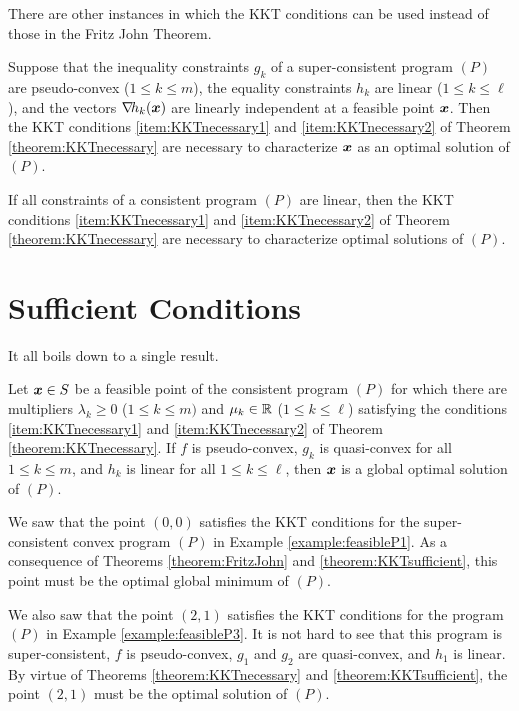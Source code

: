 \separator

There are other instances in which the KKT conditions can be used instead of those in the Fritz John Theorem.

\begin{theorem}\label{theorem:Slater}
Suppose that the inequality constraints $g_k$ of a super-consistent program $(P)$ are pseudo-convex ($1\leq k \leq m$), the equality constraints $h_k$ are linear ($1\leq k \leq \ell$), and the vectors $\mathop{\nabla\! {h_k}}(\boldsymbol{x})$ are linearly independent at a feasible point $\boldsymbol{x}$.  Then the KKT conditions \ref{item:KKTnecessary1} and \ref{item:KKTnecessary2} of Theorem \ref{theorem:KKTnecessary} are necessary to characterize $\boldsymbol{x}$ as an optimal solution of $(P)$.
\end{theorem}

\begin{theorem}\label{theorem:KKTAllLinear}
If all constraints of a consistent program $(P)$ are linear, then the KKT conditions \ref{item:KKTnecessary1} and \ref{item:KKTnecessary2} of Theorem \ref{theorem:KKTnecessary} are necessary to characterize optimal solutions of $(P)$.
\end{theorem}

\section{Sufficient Conditions}

It all boils down to a single result.

\begin{theorem}\label{theorem:KKTsufficient}
Let $\boldsymbol{x} \in S$ be a feasible point of the consistent program $(P)$ for which there are multipliers $\lambda_k \geq 0$ ($1\leq k \leq m)$ and $\mu_k \in \mathbb{R}$ ($1\leq k \leq \ell$) satisfying the conditions \ref{item:KKTnecessary1} and \ref{item:KKTnecessary2} of Theorem \ref{theorem:KKTnecessary}. If $f$ is pseudo-convex, $g_k$ is quasi-convex for all $1\leq k \leq m$, and $h_k$ is linear for all $1\leq k \leq \ell$, then $\boldsymbol{x}$ is a global optimal solution of $(P)$.
\end{theorem}

\begin{example}
We saw that the point $(0,0)$ satisfies the KKT conditions for the super-consistent convex program $(P)$ in Example \ref{example:feasibleP1}.  As a consequence of Theorems \ref{theorem:FritzJohn} and \ref{theorem:KKTsufficient}, this point must be the optimal global minimum of $(P)$.

We also saw that the point $(2,1)$ satisfies the KKT conditions for the program $(P)$ in Example \ref{example:feasibleP3}.  It is not hard to see that this program is super-consistent, $f$ is pseudo-convex, $g_1$ and $g_2$ are quasi-convex, and $h_1$ is linear.  By virtue of Theorems \ref{theorem:KKTnecessary} and \ref{theorem:KKTsufficient}, the point $(2,1)$ must be the optimal solution of $(P)$.
\end{example}

